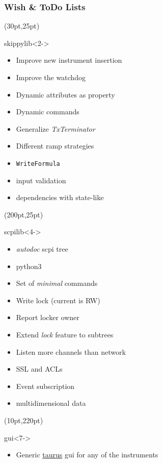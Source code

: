 \documentclass{beamer}
\begin{document}
\begin{frame}
  \frametitle{Wish \& ToDo Lists}
  \begin{textblock*}{0.45\textwidth}(30pt,25pt)
    \begin{block}{skippylib}<2->
      \begin{itemize}
        \item<alert@3> Improve new instrument insertion
        \item Improve the watchdog
        \item Dynamic attributes as property
        \item Dynamic commands
        \item Generalize \emph{TxTerminator}
        \item Different ramp strategies
        \item {\tt WriteFormula}
        \item input validation
        \item dependencies with state-like
      \end{itemize}
    \end{block}
  \end{textblock*}
  \begin{textblock*}{0.45\textwidth}(200pt,25pt)
    \begin{exampleblock}{scpilib}<4->%
      \begin{itemize}
        \item<alert@5> \emph{autodoc} scpi tree
        \item<alert@6> python3
        \item Set of \emph{minimal} commands
        \item Write lock (current is RW)
        \item Report locker owner
        \item Extend \emph{lock} feature to subtrees
        \item Listen more channels than network
        \item SSL and ACLs
        \item Event subscription
        \item multidimensional data
      \end{itemize}
    \end{exampleblock}
  \end{textblock*}
  \begin{textblock*}{0.7\textwidth}(10pt,220pt)
    \begin{alertblock}{gui}<7->
       \begin{itemize}
         \item Generic \href{www.taurus-scada.org}{taurus} gui for any of the instruments
       \end{itemize}
    \end{alertblock}
  \end{textblock*}
\end{frame}
\end{document}
